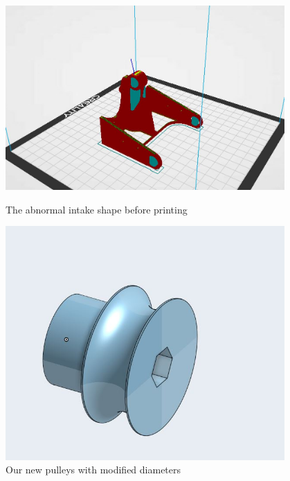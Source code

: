 \begin{figure}[ht]
\centering
\begin{minipage}[b]{.48\textwidth}
  \centering
  \includegraphics[width=0.95\textwidth]{Meetings/November/11-23-21/10-23-21_Hardware_Figure1 - Nathan Forrer.JPG}
  \caption{The abnormal intake shape before printing}
  \label{fig:pic1}
\end{minipage}%
\hfill%
\begin{minipage}[b]{.48\textwidth}
  \centering
  \includegraphics[width=0.95\textwidth]{Meetings/November/11-23-21/10-23-21_Hardware_Figure2 - Nathan Forrer.JPG}
  \caption{Our new pulleys with modified diameters}
  \label{fig:pic2}
\end{minipage}
\end{figure}

